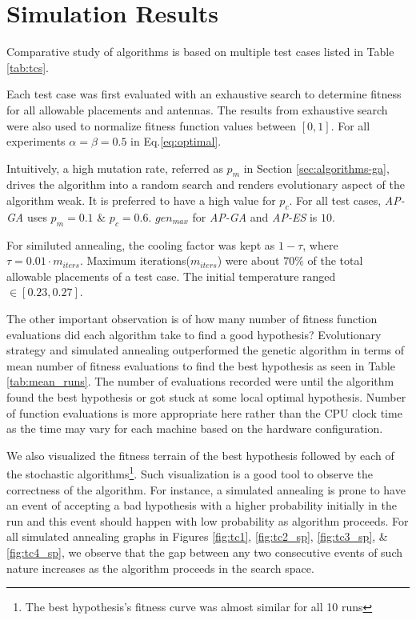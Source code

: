 \documentclass{sig-alternate}
\begin{document}
\section{Simulation Results}
\label{sec:results}
Comparative study of algorithms is based on multiple test cases listed in Table \ref{tab:tcs}. 

Each test case was first evaluated with an exhaustive search to determine fitness for all allowable placements and antennas. The results from exhaustive search were also used to normalize fitness function values between $[0,1]$. For all experiments $\alpha = \beta = 0.5$ in Eq.\eqref{eq:optimal}. 

Intuitively, a high mutation rate, referred as $p_m$ in Section \ref{sec:algorithms-ga}, drives the algorithm into a random search and renders evolutionary aspect of the algorithm weak. It is preferred to have a high value for $p_c$. For all test cases, \textit{AP-GA} uses $p_m=0.1$ \& $p_c=0.6$. $gen_{max}$ for \textit{AP-GA} and \textit{AP-ES} is $10$.

For similuted annealing, the cooling factor was kept as $1 - \tau$, where $\tau = 0.01 \cdot m_{iters}$. Maximum iterations($m_{iters}$) were about $70\%$ of the total allowable placements of a test case. The initial temperature ranged $\in [0.23, 0.27]$.

The other important observation is of how many number of fitness function evaluations did each algorithm take to find a good hypothesis? Evolutionary strategy and simulated annealing outperformed the genetic algorithm in terms of mean number of fitness evaluations to find the best hypothesis as seen in Table \ref{tab:mean_runs}. The number of evaluations recorded were until the algorithm found the best hypothesis or got stuck at some local optimal hypothesis. Number of function evaluations is more appropriate here rather than the CPU clock time as the time may vary for each machine based on the hardware configuration.

We also visualized the fitness terrain of the best hypothesis followed by each of the stochastic algorithms\footnote{The best hypothesis's fitness curve was almost similar for all 10 runs}. Such visualization is a good tool to observe the correctness of the algorithm. For instance, a simulated annealing is prone to have an event of accepting a bad hypothesis with a higher probability initially in the run and this event should happen with low probability as algorithm proceeds. For all simulated annealing graphs in Figures \ref{fig:tc1}, \ref{fig:tc2_sp}, \ref{fig:tc3_sp}, \& \ref{fig:tc4_sp}, we observe that the gap between any two consecutive events of such nature increases as the algorithm proceeds in the search space. 
\end{document}
